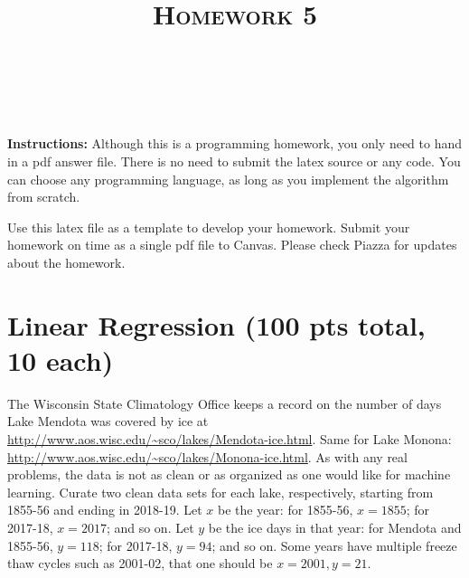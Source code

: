 \documentclass[a4paper]{article}
\title{\textsc{Homework 5}} %
\author{
\red{$AKASH SHARMA$} \\
\red{$9081731771$}\\
}
\date{}
\theoremstyle{definition}
\begin{document}
\maketitle 


\textbf{Instructions:} 
Although this is a programming homework, you only need to hand in a pdf answer file.
There is no need to submit the latex source or any code.
You can choose any programming language, as long as you implement the algorithm from scratch. 

Use this latex file as a template to develop your homework.
Submit your homework on time as a single pdf file to Canvas.
Please check Piazza for updates about the homework.



\section*{Linear Regression (100 pts total, 10 each)}

The Wisconsin State Climatology Office keeps a record on
the number of days Lake Mendota was covered by ice at
\url{http://www.aos.wisc.edu/~sco/lakes/Mendota-ice.html}.
Same for Lake Monona:
\url{http://www.aos.wisc.edu/~sco/lakes/Monona-ice.html}.
As with any real problems, the data is not as clean or as organized as one would like for machine learning.
Curate two clean data sets for each lake, respectively, starting from 1855-56 and ending in 2018-19.
Let $x$ be the year: for 1855-56, $x=1855$; for 2017-18, $x=2017$; and so on.
Let $y$ be the ice days in that year: for Mendota and 1855-56, $y=118$; for 2017-18, $y=94$; and so on.
Some years have multiple freeze thaw cycles such as 2001-02, that one should be $x=2001, y=21$.
\end{document}
